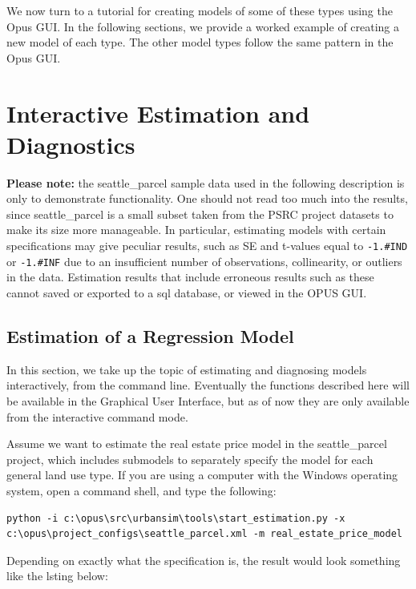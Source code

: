 We now turn to a tutorial for creating models of some of these types using the Opus GUI.  In the following sections, we provide a worked example of creating a new model of each type.  The other model types follow the same pattern in the Opus GUI.


\section{Interactive Estimation and Diagnostics}

{\bf Please note:} the seattle\_parcel sample data used in the following
description is only to demonstrate functionality.  One should not read too
much into the results, since seattle\_parcel is a small subset taken from
the PSRC project datasets to make its size more manageable.  In particular,
estimating models with certain specifications may give peculiar results,
such as SE and t-values equal to \verb|-1.#IND| or \verb|-1.#INF| due to
an insufficient number of observations, collinearity, or outliers in the
data.  Estimation results that include erroneous results such as these
cannot saved or exported to a sql database, or viewed in the OPUS GUI\@.

\subsection{Estimation of a Regression Model}

In this section, we take up the topic of estimating and diagnosing models
interactively, from the command line.  Eventually the functions described
here will be available in the Graphical User Interface, but as of now they
are only available from the interactive command mode.

Assume we want to estimate the real estate price model in the
seattle\_parcel project, which includes submodels to separately specify the
model for each general land use type.  If you are using a computer with the
Windows operating system, open a command shell, and type the following:

\begin{lstlisting}
python -i c:\opus\src\urbansim\tools\start_estimation.py -x c:\opus\project_configs\seattle_parcel.xml -m real_estate_price_model
\end{lstlisting}

Depending on exactly what the specification is, the result would look something like the lsting below:\\

